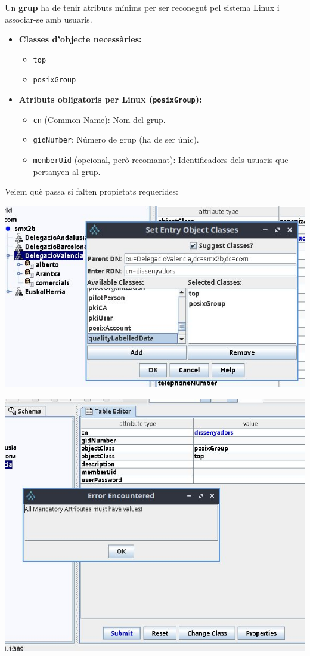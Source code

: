 \documentclass[
  12 pt,
  a4paper,
]{article}
\providecommand{\tightlist}{%
  \setlength{\itemsep}{0pt}\setlength{\parskip}{0pt}}
\begin{document}
Un \textbf{grup} ha de tenir atributs mínims per ser reconegut pel
sistema Linux i associar-se amb usuaris.

\begin{itemize}
\tightlist
\item
  \textbf{Classes d'objecte necessàries:}

  \begin{itemize}
  \tightlist
  \item
    \texttt{top}
  \item
    \texttt{posixGroup}
  \end{itemize}
\item
  \textbf{Atributs obligatoris per Linux (\texttt{posixGroup}):}

  \begin{itemize}
  \tightlist
  \item
    \texttt{cn} (Common Name): Nom del grup.
  \item
    \texttt{gidNumber}: Número de grup (ha de ser únic).
  \item
    \texttt{memberUid} (opcional, però recomanat): Identificadors dels
    usuaris que pertanyen al grup.
  \end{itemize}
\end{itemize}

Veiem què passa si falten propietats requerides:

\includegraphics{png/jxplorerNouGrup1.jpg}

\includegraphics{png/jxplorerNouGrup2.jpg}
\end{document}
